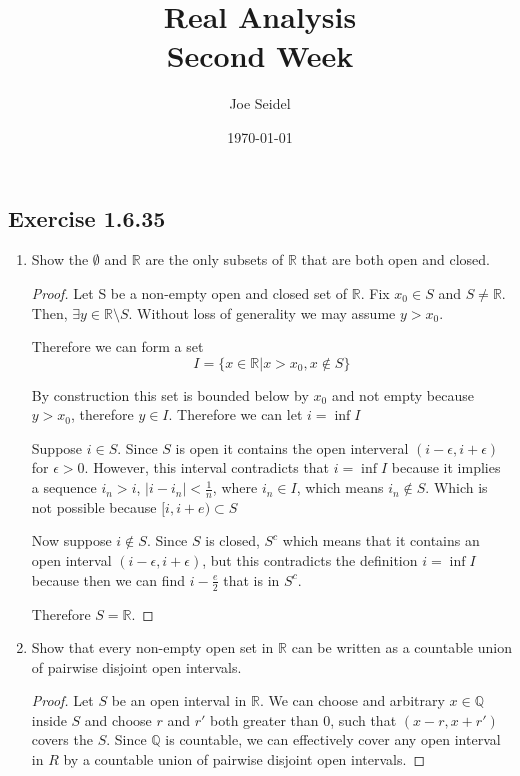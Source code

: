 \documentclass{tufte-book}
\title{Real Analysis\\Second Week }
\author{Joe Seidel}
\date{\today}
\theoremstyle{mytheoremstyle}
\theoremstyle{mylemstyle}
\theoremstyle{mydefstyle}
\begin{document}
\maketitle
{}
\newpage
{}

\subsection{Exercise 1.6.35}

\begin{enumerate}
\item Show the $\emptyset$ and $\mathbb{R}$ are the only subsets of $\mathbb{R}$ that are both open and closed.

\begin{proof}
Let S be a non-empty open and closed set of $\mathbb{R}$.  Fix $x_0 \in S$ and $S \neq \mathbb{R}$.  Then, $\exists y \in \mathbb{R} \setminus S$.  Without loss of generality we may assume $y > x_0$.

Therefore we can form a set
\[I = \{ x \in \mathbb{R} | x > x_0, x \notin S\}\]

By construction this set is bounded below by $x_0$ and not empty because $y > x_0$, therefore $y \in I$.  Therefore we can let $i = \inf I$

Suppose $i \in S$.  Since $S$ is open it contains the open interveral $(i-\epsilon, i+\epsilon)$ for $\epsilon > 0$.  However, this interval contradicts that $i = \inf I$ because it implies a sequence $i_n > i$, $|i - i_n| < \frac{1}{n}$, where $i_n \in I$, which means $i_n \notin S$.  Which is not possible because $[i, i+e) \subset S$

Now suppose $i \notin S$.  Since $S$ is closed, $S^c$ which means that it contains an open interval $(i-\epsilon, i+\epsilon)$, but this contradicts the definition $i = \inf I$ because then we can find $i - \frac{e}{2}$ that is in $S^c$.

Therefore $S = \mathbb{R}$.
\end{proof}

\item Show that every non-empty open set in $\mathbb{R}$ can be written as a countable union of pairwise disjoint open intervals.

\begin{proof}

Let $S$ be an open interval in $\mathbb{R}$.  We can choose and arbitrary $x \in \mathbb{Q}$ inside $S$ and choose $r$ and $r'$ both greater than $0$, such that $(x-r, x+r')$ covers the $S$.  Since $\mathbb{Q}$ is countable, we can effectively cover any open interval in $R$ by a countable union of pairwise disjoint open intervals.


\end{proof}
\end{enumerate}
\end{document}
